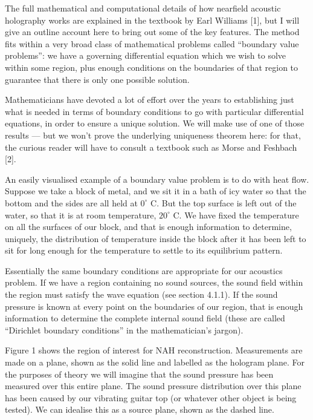   The full mathematical and computational details of how nearfield acoustic 
  holography works are explained in the textbook by Earl Williams [1], but I 
  will give an outline account here to bring out some of the key features. The 
  method fits within a very broad class of mathematical problems called 
  ``boundary value problems'': we have a governing differential equation which 
  we wish to solve within some region, plus enough conditions on the boundaries 
  of that region to guarantee that there is only one possible solution. 

  Mathematicians have devoted a lot of effort over the years to establishing 
  just what is needed in terms of boundary conditions to go with particular 
  differential equations, in order to ensure a unique solution. We will make 
  use of one of those results --- but we won't prove the underlying uniqueness 
  theorem here: for that, the curious reader will have to consult a textbook 
  such as Morse and Feshbach [2]. 

  An easily visualised example of a boundary value problem is to do with heat 
  flow. Suppose we take a block of metal, and we sit it in a bath of icy water 
  so that the bottom and the sides are all held at $0^\circ$ C. But the top 
  surface is left out of the water, so that it is at room temperature, 
  $20^\circ$ C. We have fixed the temperature on all the surfaces of our block, 
  and that is enough information to determine, uniquely, the distribution of 
  temperature inside the block after it has been left to sit for long enough 
  for the temperature to settle to its equilibrium pattern. 

  Essentially the same boundary conditions are appropriate for our acoustics 
  problem. If we have a region containing no sound sources, the sound field 
  within the region must satisfy the wave equation (see section 4.1.1). If the 
  sound pressure is known at every point on the boundaries of our region, that 
  is enough information to determine the complete internal sound field (these 
  are called ``Dirichlet boundary conditions'' in the mathematician's jargon). 

  Figure 1 shows the region of interest for NAH reconstruction. Measurements 
  are made on a plane, shown as the solid line and labelled as the hologram 
  plane. For the purposes of theory we will imagine that the sound pressure has 
  been measured over this entire plane. The sound pressure distribution over 
  this plane has been caused by our vibrating guitar top (or whatever other 
  object is being tested). We can idealise this as a source plane, shown as the 
  dashed line. 

